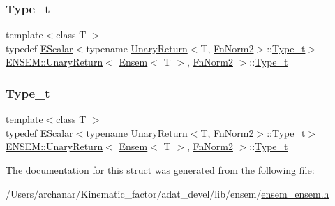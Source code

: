 \subsubsection{\texorpdfstring{Type\_t}{Type\_t}\hspace{0.1cm}{\footnotesize\ttfamily [1/2]}}
{\footnotesize\ttfamily template$<$class T $>$ \\
typedef \mbox{\hyperlink{classENSEM_1_1EScalar}{E\+Scalar}}$<$typename \mbox{\hyperlink{structENSEM_1_1UnaryReturn}{Unary\+Return}}$<$T, \mbox{\hyperlink{structENSEM_1_1FnNorm2}{Fn\+Norm2}}$>$\+::\mbox{\hyperlink{structENSEM_1_1UnaryReturn_3_01Ensem_3_01T_01_4_00_01FnNorm2_01_4_ab4124c6816741e910b729ef32c1a9c37}{Type\+\_\+t}}$>$ \mbox{\hyperlink{structENSEM_1_1UnaryReturn}{E\+N\+S\+E\+M\+::\+Unary\+Return}}$<$ \mbox{\hyperlink{classENSEM_1_1Ensem}{Ensem}}$<$ T $>$, \mbox{\hyperlink{structENSEM_1_1FnNorm2}{Fn\+Norm2}} $>$\+::\mbox{\hyperlink{structENSEM_1_1UnaryReturn_3_01Ensem_3_01T_01_4_00_01FnNorm2_01_4_ab4124c6816741e910b729ef32c1a9c37}{Type\+\_\+t}}}

\mbox{\label{structENSEM_1_1UnaryReturn_3_01Ensem_3_01T_01_4_00_01FnNorm2_01_4_ab4124c6816741e910b729ef32c1a9c37}} 
\subsubsection{\texorpdfstring{Type\_t}{Type\_t}\hspace{0.1cm}{\footnotesize\ttfamily [2/2]}}
{\footnotesize\ttfamily template$<$class T $>$ \\
typedef \mbox{\hyperlink{classENSEM_1_1EScalar}{E\+Scalar}}$<$typename \mbox{\hyperlink{structENSEM_1_1UnaryReturn}{Unary\+Return}}$<$T, \mbox{\hyperlink{structENSEM_1_1FnNorm2}{Fn\+Norm2}}$>$\+::\mbox{\hyperlink{structENSEM_1_1UnaryReturn_3_01Ensem_3_01T_01_4_00_01FnNorm2_01_4_ab4124c6816741e910b729ef32c1a9c37}{Type\+\_\+t}}$>$ \mbox{\hyperlink{structENSEM_1_1UnaryReturn}{E\+N\+S\+E\+M\+::\+Unary\+Return}}$<$ \mbox{\hyperlink{classENSEM_1_1Ensem}{Ensem}}$<$ T $>$, \mbox{\hyperlink{structENSEM_1_1FnNorm2}{Fn\+Norm2}} $>$\+::\mbox{\hyperlink{structENSEM_1_1UnaryReturn_3_01Ensem_3_01T_01_4_00_01FnNorm2_01_4_ab4124c6816741e910b729ef32c1a9c37}{Type\+\_\+t}}}



The documentation for this struct was generated from the following file\+:\begin{DoxyCompactItemize}
\item 
/\+Users/archanar/\+Kinematic\+\_\+factor/adat\+\_\+devel/lib/ensem/\mbox{\hyperlink{lib_2ensem_2ensem__ensem_8h}{ensem\+\_\+ensem.\+h}}\end{DoxyCompactItemize}
